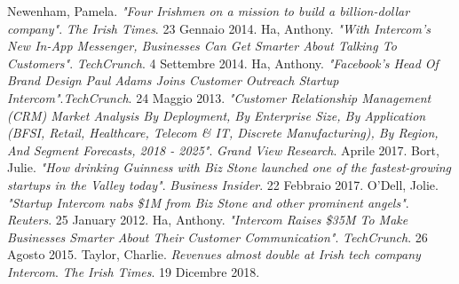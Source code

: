 \documentclass[a4paper, 11pt]{article}
\begin{document}
\begin{thebibliography}{9}
Newenham, Pamela. \emph{"Four Irishmen on a mission to build a billion-dollar company"}. \emph{The Irish Times}. 23 Gennaio 2014.
 Ha, Anthony. \emph{"With Intercom’s New In-App Messenger, Businesses Can Get Smarter About Talking To Customers"}. \emph{TechCrunch}. 4 Settembre 2014.
Ha, Anthony. \emph{"Facebook’s Head Of Brand Design Paul Adams Joins Customer Outreach Startup Intercom"}.\emph{TechCrunch}. 24 Maggio 2013.
 \textit{"Customer Relationship Management (CRM) Market Analysis By Deployment, By Enterprise Size, By Application (BFSI, Retail, Healthcare, Telecom \& IT, Discrete Manufacturing), By Region, And Segment Forecasts, 2018 - 2025"}. \textit{Grand View Research}. Aprile 2017.
 Bort, Julie. \textit{"How drinking Guinness with Biz Stone launched one of the fastest-growing startups in the Valley today"}. \textit{Business Insider}. 22 Febbraio 2017.
 O'Dell, Jolie. \textit{"Startup Intercom nabs \$1M from Biz Stone and other prominent angels"}. \textit{Reuters}. 25 January 2012.
 Ha, Anthony. \emph{"Intercom Raises \$35M To Make Businesses Smarter About Their Customer Communication"}. \emph{TechCrunch}. 26 Agosto 2015.
 Taylor, Charlie. \textit{Revenues almost double at Irish tech company Intercom}. \textit{The Irish Times}. 19 Dicembre 2018.
\end{thebibliography}
\end{document}
